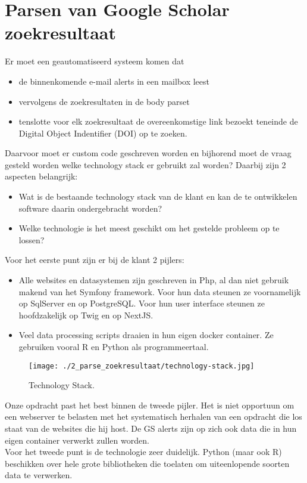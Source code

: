 \section{Parsen van Google Scholar zoekresultaat}
Er moet een geautomatiseerd systeem komen dat 
\begin{itemize}
  \item de binnenkomende e-mail alerts in een mailbox leest
  \item vervolgens de zoekresultaten in de body parset
  \item tenslotte voor elk zoekresultaat de overeenkomstige link bezoekt teneinde de Digital Object Indentifier (DOI) op te zoeken.
\end{itemize}
Daarvoor moet er custom code geschreven worden en bijhorend moet de vraag gesteld worden welke technology stack er gebruikt zal worden? Daarbij zijn 2 aspecten belangrijk:
\begin{itemize}
    \item Wat is de bestaande technology stack van de klant en kan de te ontwikkelen software daarin ondergebracht worden?
    \item Welke technologie is het meest geschikt om het gestelde probleem op te lossen?
\end{itemize}
Voor het eerste punt zijn er bij de klant 2 pijlers:
\begin{itemize}
    \item Alle websites en datasystemen zijn geschreven in Php, al dan niet gebruik makend van het Symfony framework. Voor hun data steunen ze voornamelijk op SqlServer en op PostgreSQL. Voor hun user interface steunen ze hoofdzakelijk op Twig en op NextJS.
    \item Veel data processing scripts draaien in hun eigen docker container. Ze gebruiken vooral R en Python als programmeertaal.
\end{itemize}
\begin{figure}[H]
    \centering
    \texttt{[image: ./2\_parse\_zoekresultaat/technology-stack.jpg]}
    \caption[Technology Stack.]{\label{fig:Technology Stack}Technology Stack.}
\end{figure}
Onze opdracht past het best binnen de tweede pijler. Het is niet opportuun om een webserver te belasten met het systematisch herhalen van een opdracht die los staat van de websites die hij host. De GS alerts zijn op zich ook data die in hun eigen container verwerkt zullen worden.\\
Voor het tweede punt is de technologie zeer duidelijk. Python (maar ook R) beschikken over hele grote bibliotheken die toelaten om uiteenlopende soorten data te verwerken.\\

